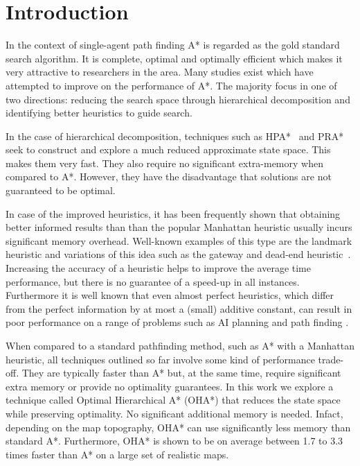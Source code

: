 \section{Introduction}
In the context of single-agent path finding A* \cite{hart68} is regarded as 
the gold standard search algorithm.
It is complete, optimal and optimally efficient which makes it very attractive 
to researchers in the area.
Many studies exist which have attempted to improve on the performance of A*. 
The majority focus in one of two directions: reducing the search space through hierarchical 
decomposition and identifying better heuristics to guide search. 
\par
In the case of hierarchical decomposition, techniques such as
HPA*~\cite{botea04} and PRA*~\cite{sturtevant05} seek to construct and explore
a much reduced approximate state space.
This makes them very fast. 
They also require no significant extra-memory when compared to A*.
However, they have the disadvantage that solutions are not guaranteed to be optimal.
\par
In case of the improved heuristics, it has been frequently shown
that obtaining better informed results than than the popular
Manhattan heuristic usually incurs significant memory overhead.
Well-known examples of this type are the landmark heuristic 
\cite{goldberg05,Cazenave:06} and variations of this idea such as the gateway and dead-end
heuristic~\cite{bjornsson06}.
Increasing the accuracy of a heuristic helps to improve the average time performance,
but there is no guarantee of a speed-up in all instances.
Furthermore it is well known that even almost perfect heuristics,
which differ from the perfect information by at most a (small) additive constant,
can result in poor performance on a range of problems such as AI planning and path finding
\cite{helmert08,pohl77}.
\par
When compared to a standard pathfinding method, such as A* with a Manhattan heuristic,
all techniques outlined so far involve some kind of performance trade-off.
They are typically faster than A* but, at the same time, require significant
extra memory or provide no optimality guarantees.
In this work we explore a technique called Optimal Hierarchical A* (OHA*) that 
reduces the state space while preserving optimality.
No significant additional memory is needed. 
Infact, depending on the map topography, OHA* can use significantly less memory than standard A*.
Furthermore, OHA* is shown to be on average between 1.7 to 3.3 
times faster than A* on a large set of realistic maps.

